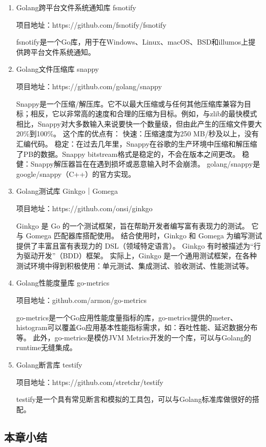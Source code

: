 	\begin{enumerate}[fullwidth,itemindent=2em,listparindent=2em]
	
		\item Golang跨平台文件系统通知库 fsnotify
		
		项目地址：https://github.com/fsnotify/fsnotify

		fsnotify是一个Go库，用于在Windows、Linux、macOS、BSD和illumos上提供跨平台文件系统通知。

		\item Golang文件压缩库 snappy
		
		项目地址：https://github.com/golang/snappy

		Snappy是一个压缩/解压库。它不以最大压缩或与任何其他压缩库兼容为目标；相反，它以非常高的速度和合理的压缩为目标。例如，与zlib的最快模式相比，Snappy对大多数输入来说要快一个数量级，但由此产生的压缩文件要大20\%到100\%。
		这个库的优点有：
		快速：压缩速度为250 MB/秒及以上，没有汇编代码。
		稳定：在过去几年里，Snappy在谷歌的生产环境中压缩和解压缩了PB的数据。Snappy bitstream格式是稳定的，不会在版本之间更改。
		稳健：Snappy解压器旨在在遇到损坏或恶意输入时不会崩溃。
		golang/snappy是google/snappy（C++）的官方实现。

		\item Golang测试库 Ginkgo｜Gomega
		
		项目地址：https://github.com/onsi/ginkgo

		Ginkgo 是 Go 的一个测试框架，旨在帮助开发者编写富有表现力的测试。 
		它与 Gomega 匹配器库搭配使用。 
		结合使用时，Ginkgo 和 Gomega 为编写测试提供了丰富且富有表现力的 DSL（领域特定语言）。
		Ginkgo 有时被描述为“行为驱动开发”（BDD）框架。 
		实际上，Ginkgo 是一个通用测试框架，在各种测试环境中得到积极使用：单元测试、集成测试、验收测试、性能测试等。
		
		\item Golang性能度量库 go-metrics
		
		项目地址：github.com/armon/go-metrics 
		
		go-metrics是一个Go应用性能度量指标的库，go-metrics提供的meter、histogram可以覆盖Go应用基本性能指标需求，如：吞吐性能、延迟数据分布等。
		此外，go-metrics是模仿JVM Metrics开发的一个库，可以与Golang的runtime无缝集成。
		
		
		\item Golang断言库 testify
		
		项目地址：https://github.com/stretchr/testify

		testify是一个具有常见断言和模拟的工具包，可以与Golang标准库做很好的搭配。
		

	\end{enumerate}
	
	\subsection{本章小结}
	
\clearpage